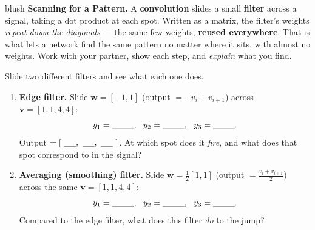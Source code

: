 \documentclass[10pt]{article}
\newcommand{\vv}{\mathbf{v}}
\newcommand{\ww}{\mathbf{w}}
\begin{document}
\namepartnerperiod

\vspace{0.10in}

\begin{headlinebox}{blush}
\small\textbf{Scanning for a Pattern.} A \textbf{convolution} slides a small \textbf{filter} across a signal,
taking a dot product at each spot. Written as a matrix, the filter's weights \emph{repeat down the diagonals}
--- the same few weights, \textbf{reused everywhere}. That is what lets a network find the same pattern no
matter where it sits, with almost no weights. Work with your partner, show each step, and \emph{explain} what
you find.
\end{headlinebox}

\vspace{0.10in}

\begin{tcolorbox}[colback=white, colframe=black!40, title=\textbf{Tier R --- Remediate},
    fonttitle=\bfseries, arc=1.5mm, left=3mm, right=3mm, top=2mm, bottom=2mm, breakable]
Slide two different filters and see what each one does.
\begin{enumerate}[leftmargin=1.7em, itemsep=8pt]
  \item \textbf{Edge filter.} Slide $\ww=[-1,1]$ (output $=-v_i+v_{i+1}$) across $\vv=[1,1,4,4]$:
        \[ y_1=\blank{0.9cm},\ \ y_2=\blank{0.9cm},\ \ y_3=\blank{0.9cm}. \]
        Output $=[\ \blank{0.5cm},\ \blank{0.5cm},\ \blank{0.5cm}\ ]$. At which spot does it \emph{fire},
        and what does that spot correspond to in the signal? \writeline
  \item \textbf{Averaging (smoothing) filter.} Slide $\ww=\tfrac12[1,1]$ (output $=\tfrac{v_i+v_{i+1}}{2}$)
        across the same $\vv=[1,1,4,4]$:
        \[ y_1=\blank{0.9cm},\ \ y_2=\blank{0.9cm},\ \ y_3=\blank{0.9cm}. \]
        Compared to the edge filter, what does this filter \emph{do} to the jump? \writeline
\end{enumerate}
\end{tcolorbox}
\end{document}
